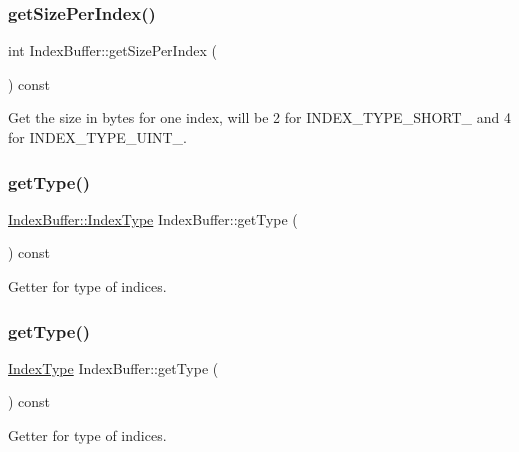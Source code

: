 \subsubsection{\texorpdfstring{get\+Size\+Per\+Index()}{getSizePerIndex()}\hspace{0.1cm}{\footnotesize\ttfamily [2/2]}}
{\footnotesize\ttfamily int Index\+Buffer\+::get\+Size\+Per\+Index (\begin{DoxyParamCaption}{ }\end{DoxyParamCaption}) const}

Get the size in bytes for one index, will be 2 for I\+N\+D\+E\+X\+\_\+\+T\+Y\+P\+E\+\_\+\+S\+H\+O\+R\+T\+\_ and 4 for I\+N\+D\+E\+X\+\_\+\+T\+Y\+P\+E\+\_\+\+U\+I\+N\+T\+\_. \mbox{\label{classIndexBuffer_a5e526c27fbb08150f04330ccce4d838e}} 
\subsubsection{\texorpdfstring{get\+Type()}{getType()}\hspace{0.1cm}{\footnotesize\ttfamily [1/2]}}
{\footnotesize\ttfamily \hyperlink{classIndexBuffer_ae2117eacd3734db21ce838397fe96c63}{Index\+Buffer\+::\+Index\+Type} Index\+Buffer\+::get\+Type (\begin{DoxyParamCaption}{ }\end{DoxyParamCaption}) const}

Getter for type of indices. \mbox{\label{classIndexBuffer_a476ab69c73e31eb4ca8c3619b2fa940f}} 
\subsubsection{\texorpdfstring{get\+Type()}{getType()}\hspace{0.1cm}{\footnotesize\ttfamily [2/2]}}
{\footnotesize\ttfamily \hyperlink{classIndexBuffer_ae2117eacd3734db21ce838397fe96c63}{Index\+Type} Index\+Buffer\+::get\+Type (\begin{DoxyParamCaption}{ }\end{DoxyParamCaption}) const}

Getter for type of indices. \mbox{\label{classIndexBuffer_aaea3df1f8e3ff4af169b6aa0206b8d07}} 
